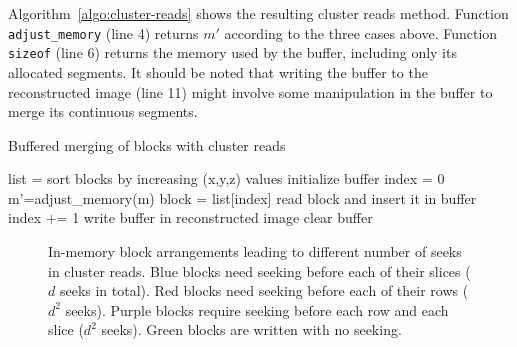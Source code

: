 \documentclass[10pt, conference, compsocconf]{IEEEtran}
\begin{document}
Algorithm~\ref{algo:cluster-reads} shows the resulting cluster reads
method. Function \texttt{adjust\_memory} (line 4) returns $m'$
according to the three cases above. Function \texttt{sizeof} (line 6)
returns the memory used by the buffer, including only its allocated
segments. It should be noted that writing the buffer to the
reconstructed image (line 11) might involve some manipulation in the
buffer to merge its continuous segments. 
\begin{algorithm}[h]
  \caption{Buffered merging of blocks with cluster reads}
  \label{algo:cluster-reads}
  \begin{algorithmic}[1]
    \STATE list = sort blocks by increasing (x,y,z) values
    \STATE initialize buffer
    \STATE index = 0
    \STATE m'=adjust\_memory(m)    
        \STATE block = list[index]
        \STATE read block and insert it in buffer
        \STATE index += 1
        \ENDWHILE
       \STATE write buffer in reconstructed image
       \STATE clear buffer
    \ENDWHILE
  \end{algorithmic}
\end{algorithm}



\begin{figure}
\centering
\def\svgwidth{0.3\columnwidth}

\def\svgwidth{0.3\columnwidth}

\def\svgwidth{0.3\columnwidth}

\def\svgwidth{0.3\columnwidth}

\def\svgwidth{0.3\columnwidth}

\def\svgwidth{0.3\columnwidth}

\def\svgwidth{0.3\columnwidth}

\def\svgwidth{0.3\columnwidth}

\def\svgwidth{0.3\columnwidth}


\caption{In-memory block arrangements leading to different number of
  seeks in cluster reads. Blue blocks need seeking before each of
  their slices ($d$ seeks in total). Red blocks need seeking before
  each of their rows ($d^2$ seeks). Purple blocks require seeking
  before each row and each slice ($d^2$ seeks). Green blocks are
  written with no seeking.}
\label{fig:cluster-reads}
\end{figure}
\end{document}
